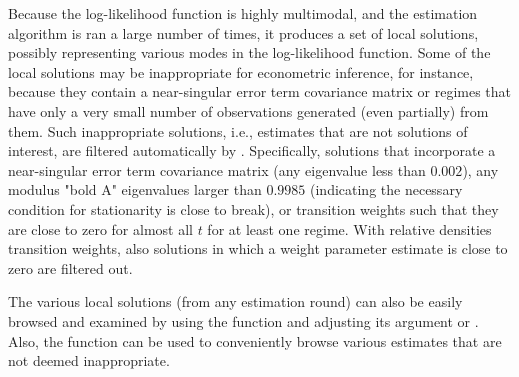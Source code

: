 \documentclass[nojss]{jss}
\begin{document}
Because the log-likelihood function is highly multimodal, and the estimation algorithm is ran a large number of times, it produces a set of local solutions, possibly representing various modes in the log-likelihood function. Some of the local solutions may be inappropriate for econometric inference, for instance, because they contain a near-singular error term covariance matrix or regimes that have only a very small number of observations generated (even partially) from them. Such inappropriate solutions, i.e., estimates that are not solutions of interest, are filtered automatically by . Specifically, solutions that incorporate a near-singular error term covariance matrix (any eigenvalue less than $0.002$), any modulus "bold A" eigenvalues larger than $0.9985$ (indicating the necessary condition for stationarity is close to break), or transition weights such that they are close to zero for almost all $t$ for at least one regime. With relative densities transition weights, also solutions in which a weight parameter estimate is close to zero are filtered out.

The various local solutions (from any estimation round) can also be easily browsed and examined by using the function  and adjusting its argument  or . Also, the function  can be used to conveniently
browse various estimates that are not deemed inappropriate.
\end{document}
